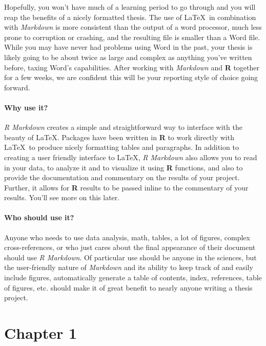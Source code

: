 \documentclass[12pt,twoside]{reedthesis}
\begin{document}
  Hopefully, you won't have much of a learning period to go through and
  you will reap the benefits of a nicely formatted thesis. The use of
  \LaTeX~in combination with \emph{Markdown} is more consistent than the
  output of a word processor, much less prone to corruption or crashing,
  and the resulting file is smaller than a Word file. While you may have
  never had problems using Word in the past, your thesis is likely going
  to be about twice as large and complex as anything you've written
  before, taxing Word's capabilities. After working with \emph{Markdown}
  and \textbf{R} together for a few weeks, we are confident this will be
  your reporting style of choice going forward.
  
  \subsubsection{Why use it?}\label{why-use-it}
  
  \emph{R Markdown} creates a simple and straightforward way to interface
  with the beauty of \LaTeX. Packages have been written in \textbf{R} to
  work directly with \LaTeX~to produce nicely formatting tables and
  paragraphs. In addition to creating a user friendly interface to \LaTeX,
  \emph{R Markdown} also allows you to read in your data, to analyze it
  and to visualize it using \textbf{R} functions, and also to provide the
  documentation and commentary on the results of your project. Further, it
  allows for \textbf{R} results to be passed inline to the commentary of
  your results. You'll see more on this later.
  
  \subsubsection{Who should use it?}\label{who-should-use-it}
  
  Anyone who needs to use data analysis, math, tables, a lot of figures,
  complex cross-references, or who just cares about the final appearance
  of their document should use \emph{R Markdown}. Of particular use should
  be anyone in the sciences, but the user-friendly nature of
  \emph{Markdown} and its ability to keep track of and easily include
  figures, automatically generate a table of contents, index, references,
  table of figures, etc. should make it of great benefit to nearly anyone
  writing a thesis project.
  
  \chapter{Chapter 1}\label{chapter-1}
  
\end{document}
